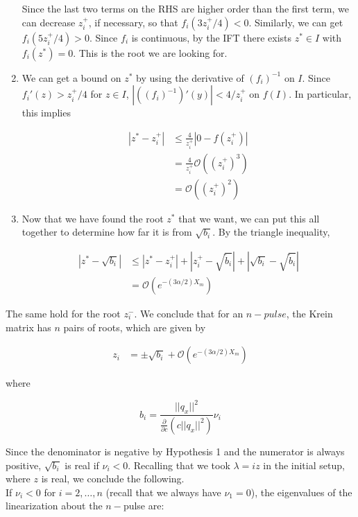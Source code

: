 \documentclass[12pt]{article}
\begin{document}
\begin{enumerate}
Since the last two terms on the RHS are higher order than the first term, we can decrease $z_i^+$, if necessary, so that $f_i(3 z_i^+/4) < 0$. Similarly, we can get $f_i(5 z_i^+/4) > 0$. Since $f_i$ is continuous, by the IFT there exists $z^* \in I$ with $f_i(z^*) = 0$. This is the root we are looking for.

\item We can get a bound on $z^*$ by using the derivative of $(f_i)^{-1}$ on $I$. Since $f_i'(z) > z_i^+/4$ for $z \in I$, $|((f_i)^{-1})'(y)| < 4 / z_i^+$ on $f(I)$. In particular, this implies

\begin{align*}
|z^* - z_i^+| &\leq \frac{4}{z_i^+}|0 - f(z_i^+)| \\
&= \frac{4}{z_i^+}\mathcal{O}((z_i^+)^3) \\
&= \mathcal{O}((z_i^+)^2)
\end{align*}

\item Now that we have found the root $z^*$ that we want, we can put this all together to determine how far it is from $\sqrt{b_i}$. By the triangle inequality,

\begin{align*}
|z^* - \sqrt{b_i}| &\leq |z^* - z_i^+| + |z_i^+ - \sqrt{\tilde{b}_i}| + |\sqrt{b_i} - \sqrt{\tilde{b}_i} | \\
&= \mathcal{O}(e^{-(3 \alpha/2) X_m})
\end{align*}

\end{enumerate}

The same hold for the root $z_i^-$. We conclude that for an $n-pulse$, the Krein matrix has $n$ pairs of roots, which are given by

\begin{align*}
z_i &= \pm \sqrt{b_i} + \mathcal{O}(e^{-(3 \alpha/2) X_m})
\end{align*}

where 

\[
b_i = \frac{||q_x||^2}{\frac{\partial}{\partial c} \left( c||q_x||^2 \right)} \nu_i
\]

Since the denominator is negative by Hypothesis 1 and the numerator is always positive, $\sqrt{b_i}$ is real if $\nu_i < 0$. Recalling that we took $\lambda = i z$ in the initial setup, where $z$ is real, we conclude the following.\\

If $\nu_i < 0$ for $i = 2, \dots, n$ (recall that we always have $\nu_1 = 0$), the eigenvalues of the linearization about the $n-$pulse are:
\end{document}
